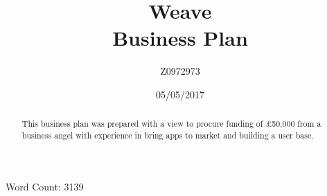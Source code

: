 \documentclass[12pt, a4paper]{article}
\title{Weave\\Business Plan}
\date{05/05/2017}
\author{Z0972973}
\begin{document}
\begin{titlingpage}
\maketitle

\begin{center}
Word Count: 3139
\end{center}

\vfill
\begin{abstract}
This business plan was prepared with a view to procure funding of \pounds 50,000 from a business angel with experience in bring apps to market and building a user base.
\end{abstract}
\end{titlingpage}

\tableofcontents
\listoftables
\listoffigures
\newpage
\end{document}
